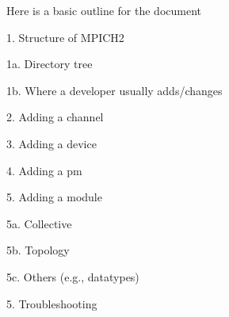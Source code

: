 \documentclass[dvipdfm,11pt]{article}
\begin{document}
Here is a basic outline for the document

1. Structure of MPICH2 

   1a. Directory tree

   1b. Where a developer usually adds/changes

2. Adding a channel

3. Adding a device

4. Adding a pm

5. Adding a module

  5a. Collective

  5b. Topology

  5c. Others (e.g., datatypes)

5. Troubleshooting
\end{document}
